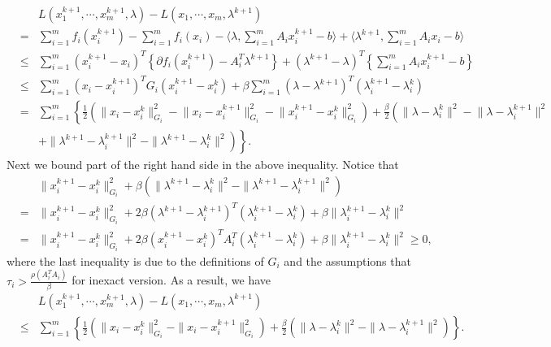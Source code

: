 \documentclass{mcom-l}
\theoremstyle{definition}
\theoremstyle{remark}
\numberwithin{equation}{section}
\begin{document}
{\small\begin{eqnarray}
&& L(x_1^{k+1},\cdots,x_m^{k+1},\lambda) - L(x_1,\cdots,x_m,\lambda^{k+1})\nonumber\\
&=& \sum\limits_{i=1}^m f_i (x_i^{k+1}) - \sum\limits_{i=1}^m f_i (x_i) -
\langle \lambda, \sum\limits_{i=1}^m A_i x_i^{k+1} - b \rangle + \langle \lambda^{k+1}, \sum\limits_{i=1}^m A_i x_i - b \rangle\nonumber\\
&\le & \sum\limits_{i=1}^m \left(x_i^{k+1} - x_i\right)^T \left\{ \partial f_i (x_i^{k+1}) - A_i^T \lambda^{k+1} \right\} + \left( \lambda^{k+1} - \lambda \right)^T \left\{ \sum\limits_{i=1}^m A_i x_i^{k+1} - b \right\}\nonumber\\
&\le & \sum\limits_{i=1}^m \left(x_i - x_i^{k+1}\right)^T G_i \left( x_i^{k+1} - x_i^k \right) + \beta \sum\limits_{i=1}^m \left( \lambda - \lambda^{k+1} \right)^T \left( \lambda_i^{k+1} - \lambda_i^k \right)\nonumber\\
& = & \sum\limits_{i=1}^m \left\{ \frac{1}{2} \left( \| x_i \!-\! x_i^k \|_{G_i}^2 \!-\! \| x_i \!-\! x_i^{k+1} \|_{G_i}^2 \!-\! \| x_i^{k+1} \!-\! x_i^k \|_{G_i}^2 \right) \!+\! \frac{\beta}{2} \left( \| \lambda \!-\! \lambda_i^k \|^2 \!-\! \| \lambda \!-\! \lambda_i^{k+1} \|^2 \right.\right.\nonumber\\
&& \left.\left.+ \| \lambda^{k+1} - \lambda_i^{k+1} \|^2 - \| \lambda^{k+1} - \lambda_i^k \|^2 \right) \right\}.\nonumber
\end{eqnarray}}
Next we bound part of the right hand side in the above inequality. Notice that
\begin{eqnarray}
&& \| x_i^{k+1} - x_i^k \|_{G_i}^2 + \beta \left( \| \lambda^{k+1} - \lambda_i^k \|^2 - \| \lambda^{k+1} - \lambda_i^{k+1} \|^2 \right)\nonumber\\
&=& \| x_i^{k+1} - x_i^k \|_{G_i}^2 + 2\beta \left( \lambda^{k+1} - \lambda_i^{k+1} \right)^T \left( \lambda_i^{k+1} - \lambda_i^k \right) + \beta \| \lambda_i^{k+1} - \lambda_i^k \|^2\nonumber\\
&=& \| x_i^{k+1} - x_i^k \|_{G_i}^2 + 2\beta \left( x_i^{k+1} - x_i^k \right)^T A_i^T \left( \lambda_i^{k+1} - \lambda_i^k \right) + \beta \| \lambda_i^{k+1} - \lambda_i^k \|^2 \ge 0,\nonumber
\end{eqnarray}
where the last inequality is due to the definitions of $G_i$ and the assumptions that $\tau_i > \frac{\rho (A_i^T A_i)}{\beta}$ for inexact version. As a result, we have
\begin{eqnarray}
&& L(x_1^{k+1},\cdots,x_m^{k+1},\lambda) - L(x_1,\cdots,x_m,\lambda^{k+1})\nonumber\\
& \le & \sum\limits_{i=1}^m \left\{ \frac{1}{2} \left( \| x_i - x_i^k \|_{G_i}^2 - \| x_i - x_i^{k+1} \|_{G_i}^2 \right) + \frac{\beta}{2} \left( \| \lambda - \lambda_i^k \|^2 - \| \lambda - \lambda_i^{k+1} \|^2 \right)\right\}.\nonumber
\end{eqnarray}
\end{document}

